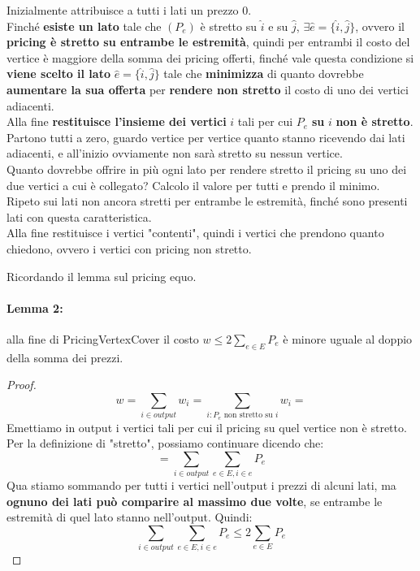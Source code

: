 Inizialmente attribuisce a tutti i lati un prezzo 0.\\

Finché \textbf{esiste un lato} tale che $(P_e)$ è stretto su $\hat{i}$ e su $\hat{j}$, $\exists \hat{e} = \{\hat{i}, \hat{j}\}$, ovvero il \textbf{pricing è stretto su entrambe le estremità}, quindi per entrambi il costo del vertice è maggiore della somma dei pricing offerti, finché vale questa condizione si \textbf{viene scelto il lato} $\hat{e} = \{\hat{i}, \hat{j}\}$ tale che \textbf{minimizza} di quanto dovrebbe \textbf{aumentare la sua offerta} per \textbf{rendere non stretto} il costo di uno dei vertici adiacenti.\\

Alla fine \textbf{restituisce l'insieme dei vertici} $i$ tali per cui $P_e$ \textbf{su} $i$ \textbf{non è stretto}.\\

Partono tutti a zero, guardo vertice per vertice quanto stanno ricevendo dai lati adiacenti, e all'inizio ovviamente non sarà stretto su nessun vertice.\\
Quanto dovrebbe offrire in più ogni lato per rendere stretto il pricing su uno dei due vertici a cui è collegato? Calcolo il valore per tutti e prendo il minimo.\\
Ripeto sui lati non ancora stretti per entrambe le estremità, finché sono presenti lati con questa caratteristica.\\

Alla fine restituisce i vertici "contenti", quindi i vertici che prendono quanto chiedono, ovvero i vertici con pricing non stretto.


\newpage

Ricordando il lemma sul pricing equo.

\paragraph{Lemma 2:} alla fine di PricingVertexCover il costo $w \leq 2 \sum_{e \in E} P_e$ è minore uguale al doppio della somma dei prezzi. \\

\begin{proof}
	$$ w = \sum_{i \in output} w_i = \sum_{i: P_e \text{ non stretto su } i} w_i = $$
	Emettiamo in output i vertici tali per cui il pricing su quel vertice non è stretto. Per la definizione di "stretto", possiamo continuare dicendo che: 
	$$ = \sum_{i \in output} \sum_{e \in E, i \in e} P_e$$
	Qua stiamo sommando per tutti i vertici nell'output i prezzi di alcuni lati, ma \textbf{ognuno dei lati può comparire al massimo due volte}, se entrambe le estremità di quel lato stanno nell'output. Quindi:
	$$ \sum_{i \in output} \sum_{e \in E, i \in e} P_e \leq 2 \sum_{e \in E} P_e$$
\end{proof}

